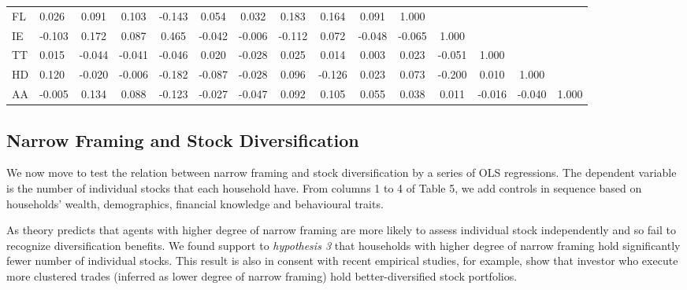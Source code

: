 \documentclass[ukenglish,nottitlepage,thmsb,11pt,letterpaper]{article}
\begin{document}
\begin{sidewaystable}
\begin{tabular*}{\textwidth}{l @{\extracolsep{\fill}} lccccccccccccc}
	FL           & 0.026        & 0.091        & 0.103        & -0.143       & 0.054        & 0.032        & 0.183        & 0.164        & 0.091        & 1.000        &              &              &              &  \\
	IE           & -0.103       & 0.172        & 0.087        & 0.465        & -0.042       & -0.006       & -0.112       & 0.072        & -0.048       & -0.065       & 1.000        &              &              &  \\
	TT           & 0.015        & -0.044       & -0.041       & -0.046       & 0.020        & -0.028       & 0.025        & 0.014        & 0.003        & 0.023        & -0.051       & 1.000        &              &  \\
	HD           & 0.120        & -0.020       & -0.006       & -0.182       & -0.087       & -0.028       & 0.096        & -0.126       & 0.023        & 0.073        & -0.200       & 0.010        & 1.000        &  \\
	AA           & -0.005       & 0.134        & 0.088        & -0.123       & -0.027       & -0.047       & 0.092        & 0.105        & 0.055        & 0.038        & 0.011        & -0.016       & -0.040       & 1.000 \\
	\bottomrule
	
	\end{tabular*}%
	\label{tab:addlabel}%
\end{sidewaystable}%
\newpage



 \subsection{Narrow Framing and Stock Diversification}


We now move to test the relation between narrow framing and stock diversification by a series of OLS regressions.  The dependent variable is the number of individual stocks that each household have. From columns 1 to 4 of Table 5, we add controls in sequence based on households' wealth, demographics, financial knowledge and behavioural traits. 

As theory predicts that agents with higher degree of narrow framing are more likely to assess individual stock independently and so fail to recognize diversification benefits. We found support to \textit{hypothesis 3} that households with higher degree of narrow framing hold significantly fewer number of individual stocks. This result is also in consent with recent empirical studies, for example, \citet{Kumar2008} show that investor who execute more clustered trades (inferred as lower degree of narrow framing) hold better-diversified stock portfolios.  
\end{document}
